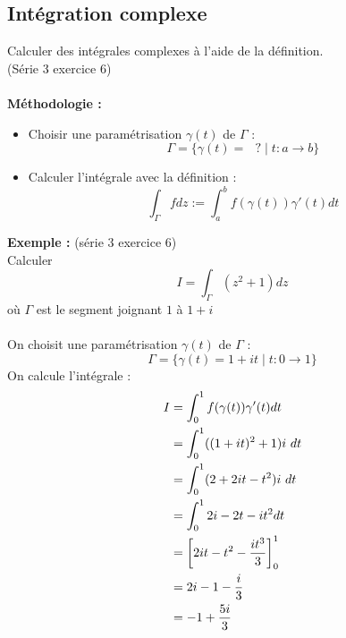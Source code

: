 \subsection{Intégration complexe}
Calculer des intégrales complexes à l’aide de la définition. \\
(Série 3 exercice 6) \\
\\
\textbf{Méthodologie :}
\begin{itemize}
    \item Choisir une paramétrisation $\gamma(t)$ de $\Gamma$ :
    $$\Gamma = \{\gamma(t) = \text{ } ? \mid t : a \to b\}$$
    \item Calculer l'intégrale avec la définition :
    $$\int_{\Gamma}fdz := \int_a^bf(\gamma(t))\gamma'(t)dt$$
\end{itemize}
\textbf{Exemple : }(série 3 exercice 6) \\
Calculer
$$I = \int_{\Gamma}(z^2+1)dz$$
où $\Gamma$ est le segment joignant $1$ à $1+i$ \\
\\
On choisit une paramétrisation $\gamma(t)$ de $\Gamma$ :
$$\Gamma = \{\gamma(t) = 1+it \mid t : 0 \to 1\}$$
On calcule l'intégrale :
\begin{align*}
    I &= \int_0^1 f(\gamma(t)) \gamma'(t) dt \\
    &= \int_0^1((1+it)^2 +1) i \text{ }dt \\
    &= \int_0^1(2 + 2it -t^2) i \text{ }dt \\
    &= \int_0^1 2i -2t - it^2 dt \\
    &= \bigg{[}2it - t^2 - \frac{it^3}{3}\bigg{]}_0^1 \\
    &= 2i - 1 - \frac{i}{3} \\
    &= -1 + \frac{5i}{3}
\end{align*}